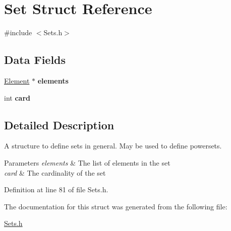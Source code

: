 \hypertarget{struct_set}{
\section{Set Struct Reference}
\label{struct_set}
}


{\ttfamily \#include $<$Sets.h$>$}

\subsection*{Data Fields}
\begin{DoxyCompactItemize}
\item 
\hypertarget{struct_set_a093302763ff645487c99e48a520e07af}{
\hyperlink{struct_element}{Element} $\ast$ {\bfseries elements}}
\label{struct_set_a093302763ff645487c99e48a520e07af}

\item 
\hypertarget{struct_set_acd789e381a684163a021e2d228653afd}{
int {\bfseries card}}
\label{struct_set_acd789e381a684163a021e2d228653afd}

\end{DoxyCompactItemize}


\subsection{Detailed Description}
A structure to define sets in general. May be used to define powersets. 
\begin{DoxyParams}{Parameters}
{\em elements} & The list of elements in the set \\
\hline
{\em card} & The cardinality of the set \\
\hline
\end{DoxyParams}


Definition at line 81 of file Sets.h.



The documentation for this struct was generated from the following file:\begin{DoxyCompactItemize}
\item 
\hyperlink{_sets_8h}{Sets.h}\end{DoxyCompactItemize}
